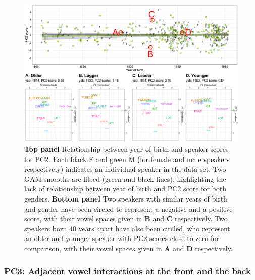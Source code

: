 \documentclass[review]{elsarticle} %
\begin{document}
\begin{figure}[!t]
\includegraphics[width=\textwidth]{Figures/PC2_speaker_loadings_example.png}
\caption{\textbf{Top panel} Relationship between year of birth and speaker scores for PC2. Each black F and green M (for female and male speakers respectively) indicates an individual speaker in the data set. Two GAM smooths are fitted (green and black lines), highlighting the lack of relationship between year of birth and PC2 score for both genders. \textbf{Bottom panel} Two speakers with similar years of birth and gender have been circled to represent a negative and a positive score, with their vowel spaces given in \textbf{B} and \textbf{C} respectively.  Two speakers born 40 years apart have also been circled, who represent an older and younger speaker with PC2 scores close to zero for comparison, with their vowel spaces given in \textbf{A} and \textbf{D} respectively.}
\label{fig:PC2_speaker_loadings}
\end{figure}

\subsubsection{PC3: Adjacent vowel interactions at the front and the back}
\label{sec:PC3}


\end{document}
